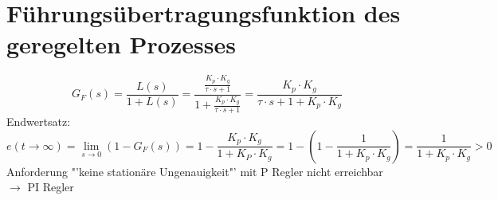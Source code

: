 \section{Führungsübertragungsfunktion des geregelten Prozesses}
\[ G_F(s) = \frac{L(s)}{1 + L(s)} 
    = \frac{\frac{K_p \cdot K_g}{\tau \cdot s + 1}}{1 + \frac{K_p \cdot K_g}{\tau \cdot s + 1}}
    = \frac{K_p \cdot K_g}{\tau \cdot s + 1 + K_p \cdot K_g}
\]
Endwertsatz: 
\[ e(t \to \infty) = \lim\limits_{s \to 0} (1 - G_F(s))
    = 1 - \frac{K_p \cdot K_g}{1 + K_P \cdot K_g}
    = 1 - \left(1 - \frac{1}{1 + K_p \cdot K_g}\right)
    = \frac{1}{1 + K_p \cdot K_g} > 0
\]
Anforderung "'keine stationäre Ungenauigkeit"' mit P Regler nicht erreichbar \\
$\rightarrow$ PI Regler
